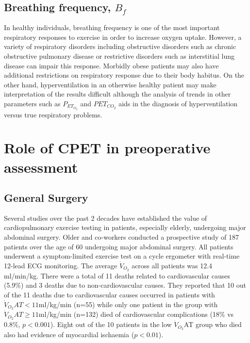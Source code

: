 \subsection{Breathing frequency, $B_f$}
In healthy individuals, breathing frequency is one of the most important respiratory responses to exercise in order to increase oxygen uptake. However, a variety of respiratory disorders including obstructive disorders such as chronic obstructive pulmonary disease or restrictive disorders such as interstitial lung disease can impair this response. Morbidly obese patients may also have additional restrictions on respiratory response due to their body habitus. On the other hand, hyperventilation in an otherwise healthy patient may make interpretation of the results difficult although the analysis of trends in other parameters such as $P_{ET_{O_2}}$ and $P{ET_{CO_2}}$ aids in the diagnosis of hyperventilation versus true respiratory problems.

\section{Role of CPET in preoperative assessment}
\label{sec:cpx_roleInAssessment}
\subsection{General Surgery}

Several studies over the past 2 decades have established the value of cardiopulmonary exercise testing in patients, especially elderly, undergoing major abdominal surgery. Older and co-workers conducted a prospective study of 187 patients over the age of 60 undergoing major abdominal surgery. All patients underwent a symptom-limited exercise test on a cycle ergometer with real-time 12-lead ECG monitoring. The average $\dot{V}_{O_2}$ across all patients was 12.4 ml/min/kg. There were a total of 11 deaths related to cardiovascular causes (5.9\%) and 3 deaths due to non-cardiovascular causes. They reported that 10 out of the 11 deaths due to cardiovascular causes occurred in patients with $\dot{V}_{O_2}AT<11$ml/kg/min (n=55) while only one patient in the group with $\dot{V}_{O_2}AT\geq11$ml/kg/min (n=132) died of cardiovascular complications (18\% vs 0.8\%, $p<0.001$). Eight out of the 10 patients in the low $\dot{V}_{O_2}$AT group who died also had evidence of myocardial ischaemia ($p<0.01$).\parencite{older_preoperative_1993}
 
